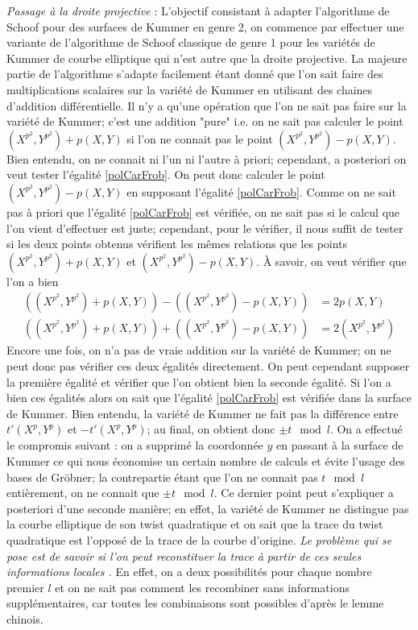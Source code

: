 \documentclass[a4paper]{article}
\theoremstyle{definition}
\theoremstyle{remark}
\numberwithin{equation}{section}
\begin{document}
\emph{Passage à la droite projective} : L'objectif consistant à adapter l'algorithme de Schoof pour des surfaces de Kummer en genre 2, on commence par effectuer une variante de l'algorithme de Schoof classique de genre 1 pour les variétés de Kummer de courbe elliptique qui n'est autre que la droite projective. La majeure partie de l'algorithme s'adapte facilement étant donné que l'on sait faire des multiplications scalaires sur la variété de Kummer en utilisant des chaines d'addition différentielle. Il n'y a qu'une opération que l'on ne sait pas faire sur la variété de Kummer; c'est une addition "pure" i.e. on ne sait pas calculer le point $(X^{p^2},Y^{p^2}) + p(X,Y)$ si l'on ne connait pas le point $(X^{p^2},Y^{p^2}) - p(X,Y)$. Bien entendu, on ne connait ni l'un ni l'autre à priori; cependant, a posteriori on veut tester l'égalité \eqref{polCarFrob}. On peut donc calculer le point $(X^{p^2},Y^{p^2}) - p(X,Y)$ en supposant l'égalité \eqref{polCarFrob}. Comme on ne sait pas à priori que l'égalité \eqref{polCarFrob} est vérifiée, on ne sait pas si le calcul que l'on vient d'effectuer est juste; cependant, pour le vérifier, il nous suffit de tester si les deux points obtenus vérifient les mêmes relations que les points $(X^{p^2},Y^{p^2}) + p(X,Y)$ et $(X^{p^2},Y^{p^2}) - p(X,Y)$. À savoir, on veut vérifier que l'on a bien
\begin{align*}
((X^{p^2},Y^{p^2}) + p(X,Y)) - ((X^{p^2},Y^{p^2}) - p(X,Y)) &= 2p(X,Y) \\
((X^{p^2},Y^{p^2}) + p(X,Y)) + ((X^{p^2},Y^{p^2}) - p(X,Y)) &= 2(X^{p^2},Y^{p^2})
\end{align*}
Encore une fois, on n'a pas de vraie addition sur la variété de Kummer; on ne peut donc pas vérifier ces deux égalités directement. On peut cependant supposer la première égalité et vérifier que l'on obtient bien la seconde égalité. Si l'on a bien ces égalités alors on sait que l'égalité \eqref{polCarFrob} est vérifiée dans la surface de Kummer. Bien entendu, la variété de Kummer ne fait pas la différence entre $t'(X^p,Y^p)$ et $-t'(X^p,Y^p)$; au final, on obtient donc $\pm t \mod l$. On a effectué le compromis suivant : on a supprimé la coordonnée $y$ en passant à la surface de Kummer ce qui nous économise un certain nombre de calculs et évite l'usage des bases de Gröbner; la contrepartie étant que l'on ne connait pas $t \mod l$ entièrement, on ne connait que $\pm t \mod l$. Ce dernier point peut s'expliquer a posteriori d'une seconde manière; en effet, la variété de Kummer ne distingue pas la courbe elliptique de son twist quadratique et on sait que la trace du twist quadratique est l'opposé de la trace de la courbe d'origine. \emph{Le problème qui se pose est de savoir si l'on peut reconstituer la trace à partir de ces seules informations locales .} En effet, on a deux possibilités pour chaque nombre premier $l$ et on ne sait pas comment les recombiner sans informations supplémentaires, car toutes les combinaisons sont possibles d'après le lemme chinois.
\end{document}
